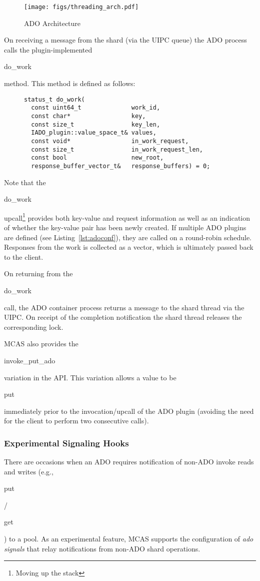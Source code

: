 \documentclass[letterpaper,twocolumn,10pt]{article}
\newcommand{\code}[1]{\begin{ttcodefont}#1\end{ttcodefont}}
\begin{document}
\begin{figure}[ht]
\centering
\texttt{[image: figs/threading\_arch.pdf]}
\caption{ADO Architecture}
\label{fig:adoarch}
\end{figure}

On receiving a message from the shard (via the UIPC queue)
the ADO process calls the plugin-implemented \code{do\_work} method. This
method is defined as follows:

\begin{figure}[h]
\begin{minipage}{\linewidth}
\begin{lstlisting}[frame=none]
status_t do_work(
  const uint64_t              work_id,
  const char*                 key,
  const size_t                key_len,
  IADO_plugin::value_space_t& values,
  const void*                 in_work_request,
  const size_t                in_work_request_len,
  const bool                  new_root,
  response_buffer_vector_t&   response_buffers) = 0;
\end{lstlisting}
\end{minipage}
\end{figure}

Note that the \code{do\_work} upcall\footnote{Moving up the stack}
provides both key-value and request information as well as an indication of
whether the key-value pair has been newly created.  If multiple ADO plugins are
defined (see Listing~\ref{lst:adoconf}), they are called on a
round-robin schedule.  Responses from the work is collected as a
vector, which is ultimately passed back to the client.

On returning from the \code{do\_work} call, the ADO container process
returns a message to the shard thread via the UIPC.  On receipt of the
completion notification the shard thread releases the corresponding
lock.

MCAS also provides the \code{invoke\_put\_ado} variation in the API.
This variation allows a value to be \code{put} immediately prior to the
invocation/upcall of the ADO plugin (avoiding the need for the client
to perform two consecutive calls).


\subsubsection{Experimental Signaling Hooks}

There are occasions when an ADO requires notification of
non-ADO invoke reads and writes (e.g., \code{put}/\code{get}) to
a pool.  As an experimental feature, MCAS supports the configuration
of \textit{ado signals} that relay notifications from non-ADO shard
operations.
\end{document}
